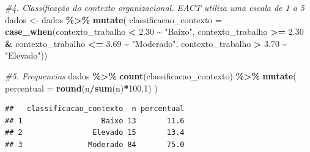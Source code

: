\documentclass[
]{article}
\newenvironment{Shaded}{\begin{snugshade}}{\end{snugshade}}
\newcommand{\AttributeTok}[1]{\textcolor[rgb]{0.13,0.29,0.53}{#1}}
\newcommand{\CommentTok}[1]{\textcolor[rgb]{0.56,0.35,0.01}{\textit{#1}}}
\newcommand{\DecValTok}[1]{\textcolor[rgb]{0.00,0.00,0.81}{#1}}
\newcommand{\FloatTok}[1]{\textcolor[rgb]{0.00,0.00,0.81}{#1}}
\newcommand{\FunctionTok}[1]{\textcolor[rgb]{0.13,0.29,0.53}{\textbf{#1}}}
\newcommand{\NormalTok}[1]{#1}
\newcommand{\OtherTok}[1]{\textcolor[rgb]{0.56,0.35,0.01}{#1}}
\newcommand{\SpecialCharTok}[1]{\textcolor[rgb]{0.81,0.36,0.00}{\textbf{#1}}}
\newcommand{\StringTok}[1]{\textcolor[rgb]{0.31,0.60,0.02}{#1}}
\begin{document}
\begin{Shaded}
\begin{Highlighting}[]
\CommentTok{\#4. Classificação do contexto organizacional. EACT utiliza uma escala de 1 a 5}
\NormalTok{dados }\OtherTok{\textless{}{-}}\NormalTok{ dados }\SpecialCharTok{\%\textgreater{}\%}
  \FunctionTok{mutate}\NormalTok{(}
    \AttributeTok{classificacao\_contexto =}
      \FunctionTok{case\_when}\NormalTok{(contexto\_trabalho }\SpecialCharTok{\textless{}} \FloatTok{2.30} \SpecialCharTok{\textasciitilde{}} \StringTok{"Baixo"}\NormalTok{,}
\NormalTok{                contexto\_trabalho }\SpecialCharTok{\textgreater{}=} \FloatTok{2.30} \SpecialCharTok{\&}\NormalTok{ contexto\_trabalho }\SpecialCharTok{\textless{}=} \FloatTok{3.69} \SpecialCharTok{\textasciitilde{}} \StringTok{"Moderado"}\NormalTok{,}
\NormalTok{                contexto\_trabalho }\SpecialCharTok{\textgreater{}} \FloatTok{3.70} \SpecialCharTok{\textasciitilde{}} \StringTok{"Elevado"}\NormalTok{))}

\CommentTok{\#5. Frequencias}
\NormalTok{dados }\SpecialCharTok{\%\textgreater{}\%}
  \FunctionTok{count}\NormalTok{(classificacao\_contexto) }\SpecialCharTok{\%\textgreater{}\%}
  \FunctionTok{mutate}\NormalTok{(}
    \AttributeTok{percentual =}
      \FunctionTok{round}\NormalTok{(n}\SpecialCharTok{/}\FunctionTok{sum}\NormalTok{(n)}\SpecialCharTok{*}\DecValTok{100}\NormalTok{,}\DecValTok{1}\NormalTok{)}
\NormalTok{  )}
\end{Highlighting}
\end{Shaded}

\begin{verbatim}
##   classificacao_contexto  n percentual
## 1                  Baixo 13       11.6
## 2                Elevado 15       13.4
## 3               Moderado 84       75.0
\end{verbatim}
\end{document}
